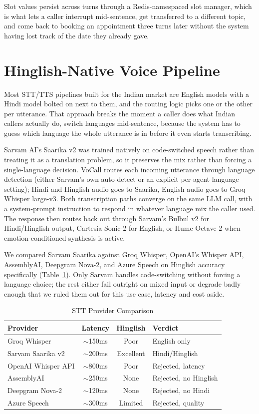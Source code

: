 \documentclass[conference]{IEEEtran}
\begin{document}
Slot values persist across turns through a Redis-namespaced slot manager, which is what lets a caller interrupt mid-sentence, get transferred to a different topic, and come back to booking an appointment three turns later without the system having lost track of the date they already gave.

\section{Hinglish-Native Voice Pipeline}
\label{sec:hinglish}

Most STT/TTS pipelines built for the Indian market are English models with a Hindi model bolted on next to them, and the routing logic picks one or the other per utterance. That approach breaks the moment a caller does what Indian callers actually do, switch languages mid-sentence, because the system has to guess which language the whole utterance is in before it even starts transcribing.

Sarvam AI's Saarika v2 was trained natively on code-switched speech rather than treating it as a translation problem, so it preserves the mix rather than forcing a single-language decision. VoCall routes each incoming utterance through language detection (either Sarvam's own auto-detect or an explicit per-agent language setting); Hindi and Hinglish audio goes to Saarika, English audio goes to Groq Whisper large-v3. Both transcription paths converge on the same LLM call, with a system-prompt instruction to respond in whatever language mix the caller used. The response then routes back out through Sarvam's Bulbul v2 for Hindi/Hinglish output, Cartesia Sonic-2 for English, or Hume Octave 2 when emotion-conditioned synthesis is active.

We compared Sarvam Saarika against Groq Whisper, OpenAI's Whisper API, AssemblyAI, Deepgram Nova-2, and Azure Speech on Hinglish accuracy specifically (Table~\ref{tab:sttcompare}). Only Sarvam handles code-switching without forcing a language choice; the rest either fail outright on mixed input or degrade badly enough that we ruled them out for this use case, latency and cost aside.

\begin{table}[t]
\centering
\caption{STT Provider Comparison}
\label{tab:sttcompare}
\footnotesize
\begin{tabularx}{\columnwidth}{@{}l c c X@{}}
\toprule
\textbf{Provider} & \textbf{Latency} & \textbf{Hinglish} & \textbf{Verdict} \\
\midrule
Groq Whisper & $\sim$150ms & Poor & English only \\
Sarvam Saarika v2 & $\sim$200ms & Excellent & Hindi/Hinglish \\
OpenAI Whisper API & $\sim$800ms & Poor & Rejected, latency \\
AssemblyAI & $\sim$250ms & None & Rejected, no Hinglish \\
Deepgram Nova-2 & $\sim$120ms & None & Rejected, no Hindi \\
Azure Speech & $\sim$300ms & Limited & Rejected, quality \\
\bottomrule
\end{tabularx}
\end{table}
\end{document}
